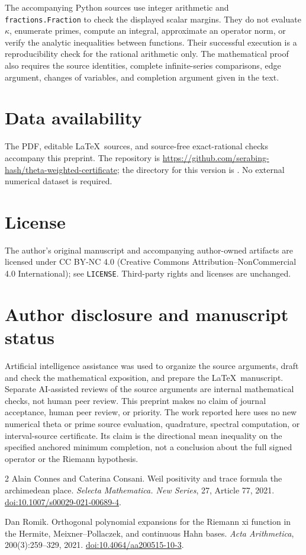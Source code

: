 \documentclass[11pt]{article}
\theoremstyle{remark}\newtheorem{remark}[theorem]{Remark}
\numberwithin{equation}{section}
\begin{document}
The accompanying Python sources use integer arithmetic and
\texttt{fractions.Fraction} to check the displayed scalar margins. They do not evaluate $\kappa$, enumerate primes, compute an integral, approximate an operator norm, or verify the analytic inequalities between functions. Their successful execution is a reproducibility check for the rational arithmetic only. The mathematical proof also requires the source identities, complete infinite-series comparisons, edge argument, changes of variables, and completion argument given in the text.

\section*{Data availability}
The PDF, editable \LaTeX\ sources, and source-free exact-rational checks accompany this preprint. The repository is
\url{https://github.com/serabing-hash/theta-weighted-certificate};
the directory for this version is
.
No external numerical dataset is required.

\section*{License}
The author's original manuscript and accompanying author-owned artifacts are licensed under CC BY-NC 4.0 (Creative Commons Attribution--NonCommercial 4.0 International); see \texttt{LICENSE}. Third-party rights and licenses are unchanged.

\section*{Author disclosure and manuscript status}
Artificial intelligence assistance was used to organize the source arguments, draft and check the mathematical exposition, and prepare the \LaTeX\ manuscript. Separate AI-assisted reviews of the source arguments are internal mathematical checks, not human peer review. This preprint makes no claim of journal acceptance, human peer review, or priority. The work reported here uses no new numerical theta or prime source evaluation, quadrature, spectral computation, or interval-source certificate. Its claim is the directional mean inequality on the specified anchored minimum completion, not a conclusion about the full signed operator or the Riemann hypothesis.

\begin{thebibliography}{2}
Alain Connes and Caterina Consani.
\newblock Weil positivity and trace formula the archimedean place.
\newblock \emph{Selecta Mathematica. New Series}, 27, Article 77, 2021.
\newblock \href{https://doi.org/10.1007/s00029-021-00689-4}{doi:10.1007/s00029-021-00689-4}.

Dan Romik.
\newblock Orthogonal polynomial expansions for the Riemann xi function in the Hermite, Meixner--Pollaczek, and continuous Hahn bases.
\newblock \emph{Acta Arithmetica}, 200(3):259--329, 2021.
\newblock \href{https://doi.org/10.4064/aa200515-10-3}{doi:10.4064/aa200515-10-3}.
\end{thebibliography}
\end{document}
